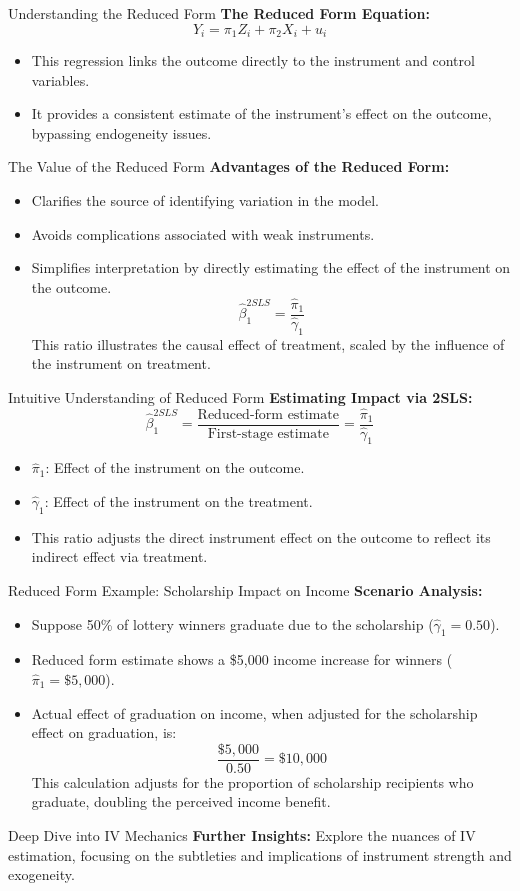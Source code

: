 \documentclass{beamer}
\theoremstyle{plain}
\begin{document}
\begin{frame}{Understanding the Reduced Form}
	\textbf{The Reduced Form Equation:}
	\[
	Y_i = \pi_1 Z_i + \pi_2 X_i + u_i
	\]
	\begin{itemize}
		\item This regression links the outcome directly to the instrument and control variables.
		\item It provides a consistent estimate of the instrument's effect on the outcome, bypassing endogeneity issues.
	\end{itemize}
\end{frame}

\begin{frame}{The Value of the Reduced Form}
	\textbf{Advantages of the Reduced Form:}
	\begin{itemize}
		\item Clarifies the source of identifying variation in the model.
		\item Avoids complications associated with weak instruments.
		\item Simplifies interpretation by directly estimating the effect of the instrument on the outcome.
		\[
		\widehat{\beta}_{1}^{2SLS} = \frac{\widehat{\pi}_{1}}{\widehat{\gamma}_{1}}
		\]
		This ratio illustrates the causal effect of treatment, scaled by the influence of the instrument on treatment.
	\end{itemize}
\end{frame}

\begin{frame}{Intuitive Understanding of Reduced Form}
	\textbf{Estimating Impact via 2SLS:}
	\[
	\widehat{\beta}_{1}^{2SLS} = \frac{\text{Reduced-form estimate}}{\text{First-stage estimate}} = \frac{\widehat{\pi}_{1}}{\widehat{\gamma}_{1}}
	\]
	\begin{itemize}
		\item \(\widehat{\pi}_1\): Effect of the instrument on the outcome.
		\item \(\widehat{\gamma}_1\): Effect of the instrument on the treatment.
		\item This ratio adjusts the direct instrument effect on the outcome to reflect its indirect effect via treatment.
	\end{itemize}
\end{frame}

\begin{frame}{Reduced Form Example: Scholarship Impact on Income}
	\textbf{Scenario Analysis:}
	\begin{itemize}
		\item Suppose 50\% of lottery winners graduate due to the scholarship (\(\widehat{\gamma}_1 = 0.50\)).
		\item Reduced form estimate shows a \$5,000 income increase for winners (\(\widehat{\pi}_1 = \$5,000\)).
		\item Actual effect of graduation on income, when adjusted for the scholarship effect on graduation, is:
		\[
		\frac{\$5,000}{0.50} = \$10,000
		\]
		This calculation adjusts for the proportion of scholarship recipients who graduate, doubling the perceived income benefit.
	\end{itemize}
\end{frame}

\begin{frame}{Deep Dive into IV Mechanics}
	\textbf{Further Insights:}
	Explore the nuances of IV estimation, focusing on the subtleties and implications of instrument strength and exogeneity.
\end{frame}

	
\end{document}
